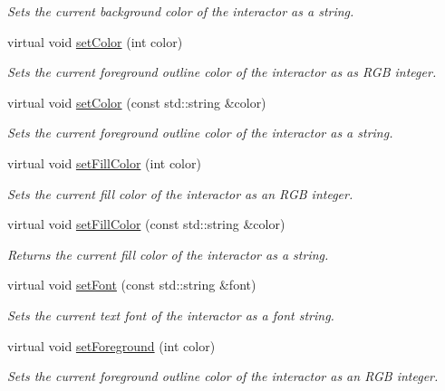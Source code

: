 \begin{DoxyCompactItemize}
\begin{DoxyCompactList}\small\item\em Sets the current background color of the interactor as a string. \end{DoxyCompactList}\item 
virtual void \mbox{\hyperlink{classGDrawingSurface_a75b9cb32ff80bf061791beb01a8433d0}{set\+Color}} (int color)
\begin{DoxyCompactList}\small\item\em Sets the current foreground outline color of the interactor as as R\+GB integer. \end{DoxyCompactList}\item 
virtual void \mbox{\hyperlink{classGDrawingSurface_a61374df6c11b52cfbb0815decdbaebc6}{set\+Color}} (const std\+::string \&color)
\begin{DoxyCompactList}\small\item\em Sets the current foreground outline color of the interactor as a string. \end{DoxyCompactList}\item 
virtual void \mbox{\hyperlink{classGDrawingSurface_a47fad447b715f2f303538434eed26709}{set\+Fill\+Color}} (int color)
\begin{DoxyCompactList}\small\item\em Sets the current fill color of the interactor as an R\+GB integer. \end{DoxyCompactList}\item 
virtual void \mbox{\hyperlink{classGDrawingSurface_adbc18b1a930aadd97d7437f9f7265b96}{set\+Fill\+Color}} (const std\+::string \&color)
\begin{DoxyCompactList}\small\item\em Returns the current fill color of the interactor as a string. \end{DoxyCompactList}\item 
virtual void \mbox{\hyperlink{classGDrawingSurface_a8e096e8818d838aceae1d46d58fb3a7b}{set\+Font}} (const std\+::string \&font)
\begin{DoxyCompactList}\small\item\em Sets the current text font of the interactor as a font string. \end{DoxyCompactList}\item 
virtual void \mbox{\hyperlink{classGDrawingSurface_a7daa57084b5811b598fce8726660b328}{set\+Foreground}} (int color)
\begin{DoxyCompactList}\small\item\em Sets the current foreground outline color of the interactor as an R\+GB integer. \end{DoxyCompactList}\item 

\end{DoxyCompactItemize}
